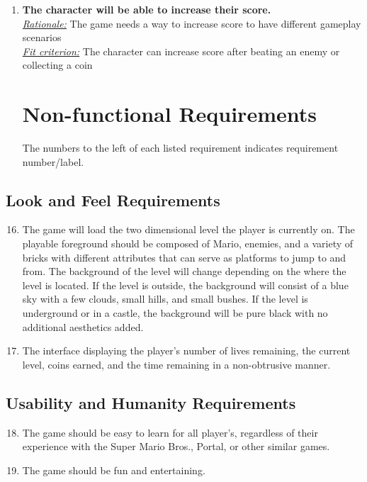 \documentclass[12pt, titlepage]{article}
\begin{document}
\begin{enumerate}
\item \textbf{The character will be able to increase their score.} \\
\underline{\textit{Rationale:}} The game needs a way to increase score to have different gameplay scenarios\\
\underline{\textit{Fit criterion:}} The character can increase score after beating an enemy or collecting a coin\\
\section{Non-functional Requirements}
The numbers to the left of each listed requirement indicates requirement number/label.
\end{enumerate}

\subsection{Look and Feel Requirements}
\begin{enumerate}
\setcounter{enumi}{15}
	\item The game will load the two dimensional level the player is currently on. The playable foreground should be composed of Mario, enemies, and a variety of bricks with different attributes that can serve as platforms to jump to and from. The background of the level will change depending on the where the level is located. If the level is outside, the background will consist of a blue sky with a few clouds, small hills, and small bushes. If the level is underground or in a castle, the background will be pure black with no additional aesthetics added.
	\item The interface displaying the player's number of lives remaining, the current level, coins earned, and the time remaining in a non-obtrusive manner.
\end{enumerate}

\subsection{Usability and Humanity Requirements}
\begin{enumerate}
\setcounter{enumi}{17}
	\item The game should be easy to learn for all player's, regardless of their experience with the Super Mario Bros., Portal, or other similar games.
	\item The game should be fun and entertaining.
\end{enumerate}
\end{document}

